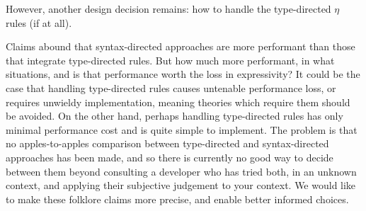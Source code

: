 

However, another design decision remains: how to handle the type-directed $\eta$ rules (if at all).

Claims abound that syntax-directed approaches are more performant than those that integrate type-directed rules.
But how much more performant, in what situations, and is that performance worth the loss in expressivity?
It could be the case that handling type-directed rules causes untenable performance loss, or requires unwieldy implementation, meaning theories which require them should be avoided.
On the other hand, perhaps handling type-directed rules has only minimal performance cost and is quite simple to implement.
The problem is that no apples-to-apples comparison between type-directed and syntax-directed approaches has been made, and so there is currently no good way to decide between them beyond consulting a developer who has tried both, in an unknown context, and applying their subjective judgement to your context.
We would like to make these folklore claims more precise, and enable better informed choices.

%

